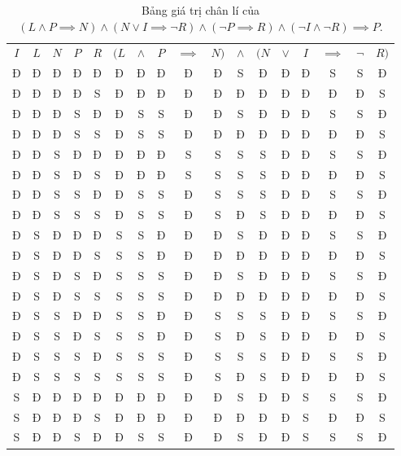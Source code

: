 \begin{table}[H]
    \centering
	\caption{Bảng giá trị chân lí của $( L \land P \implies N ) \land ( N \lor I \implies \neg R ) \land ( \neg P \implies R ) \land ( \neg I \land \neg R ) \implies P$.}
    \label{tab:nen_tang_lo_gich:giai_tich_menh_de:lap_luan:bai_2_phan_4}
	\begin{tabular}{|c|c|c|c|c|cccccccccccc|}
		\hline
		$I$ & $L$ & $N$ & $P$ & $R$ & $(L$ & $\land$ & $P$ & $\implies$ & $N)$ & $\land$ & $(N$ & $\lor$ & $I$ & $\implies$ & $\neg$ & $R)$ \\
		\headerDivider
		Đ & Đ & Đ & Đ & Đ & Đ & Đ & Đ & Đ & Đ & S & Đ & Đ & Đ & S & S & Đ \\
		Đ & Đ & Đ & Đ & S & Đ & Đ & Đ & Đ & Đ & Đ & Đ & Đ & Đ & Đ & Đ & S \\
		Đ & Đ & Đ & S & Đ & Đ & S & S & Đ & Đ & S & Đ & Đ & Đ & S & S & Đ \\
		Đ & Đ & Đ & S & S & Đ & S & S & Đ & Đ & Đ & Đ & Đ & Đ & Đ & Đ & S \\
		Đ & Đ & S & Đ & Đ & Đ & Đ & Đ & S & S & S & S & Đ & Đ & S & S & Đ \\
		Đ & Đ & S & Đ & S & Đ & Đ & Đ & S & S & S & S & Đ & Đ & Đ & Đ & S \\
		Đ & Đ & S & S & Đ & Đ & S & S & Đ & S & S & S & Đ & Đ & S & S & Đ \\
		Đ & Đ & S & S & S & Đ & S & S & Đ & S & Đ & S & Đ & Đ & Đ & Đ & S \\
		Đ & S & Đ & Đ & Đ & S & S & Đ & Đ & Đ & S & Đ & Đ & Đ & S & S & Đ \\
		Đ & S & Đ & Đ & S & S & S & Đ & Đ & Đ & Đ & Đ & Đ & Đ & Đ & Đ & S \\
		Đ & S & Đ & S & Đ & S & S & S & Đ & Đ & S & Đ & Đ & Đ & S & S & Đ \\
		Đ & S & Đ & S & S & S & S & S & Đ & Đ & Đ & Đ & Đ & Đ & Đ & Đ & S \\
		Đ & S & S & Đ & Đ & S & S & Đ & Đ & S & S & S & Đ & Đ & S & S & Đ \\
		Đ & S & S & Đ & S & S & S & Đ & Đ & S & Đ & S & Đ & Đ & Đ & Đ & S \\
		Đ & S & S & S & Đ & S & S & S & Đ & S & S & S & Đ & Đ & S & S & Đ \\
		Đ & S & S & S & S & S & S & S & Đ & S & Đ & S & Đ & Đ & Đ & Đ & S \\
		S & Đ & Đ & Đ & Đ & Đ & Đ & Đ & Đ & Đ & S & Đ & Đ & S & S & S & Đ \\
		S & Đ & Đ & Đ & S & Đ & Đ & Đ & Đ & Đ & Đ & Đ & Đ & S & Đ & Đ & S \\
		S & Đ & Đ & S & Đ & Đ & S & S & Đ & Đ & S & Đ & Đ & S & S & S & Đ \\

\end{tabular}
\end{table}
